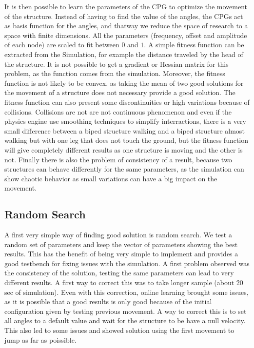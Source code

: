 It is then possible to learn the parameters of the CPG to optimize the movement of the structure. Instead of having to find the value of the angles, the CPGs act as basis function for the angles, and thatway we reduce the space of research to a space with finite dimensions. All the parameters (frequency, offset and amplitude of each node) are scaled to fit between $0$ and $1$. A simple fitness function can be extracted from the Simulation, for example the distance traveled by the head of the structure. It is not possible to get a gradient or Hessian matrix for this problem, as the function comes from the simulation. Moreover, the fitness function is not likely to be convex, as taking the mean of two good solutions for the movement of a structure does not necessary provide a good solution. The fitness function can also present some discontinuities or high variations because of collisions. Collisions are not are not continuous phenomenon and even if the physics engine use smoothing techniques to simplify interractions, there is a very small difference between a biped structure walking and a biped structure almost walking but with one leg that does not touch the ground, but the fitness function will give completely different results as one structure is moving and the other is not. Finally there is also the problem of consistency of a result, because two structures can behave differently for the same parameters, as the simulation can show chaotic behavior as small variations can have a big impact on the movement. 

\subsection{Random Search}

A first very simple way of finding good solution is random search. We test a random set of parameters and keep the vector of parameters showing the best results. This has the benefit of being very simple to implement and provides a good testbench for fixing issues with the simulation. A first problem observed was the consistency of the solution, testing the same parameters can lead to very different results. A first way to correct this was to take longer sample (about 20 sec of simulation). Even with this correction, online learning brought some issues, as it is possible that a good results is only good because of the initial configuration given by testing previous movement. A way to correct this is to set all angles to a default value and wait for the structure to be have a null velocity. This also led to some issues and showed solution using the first movement to jump as far as poissible. 
